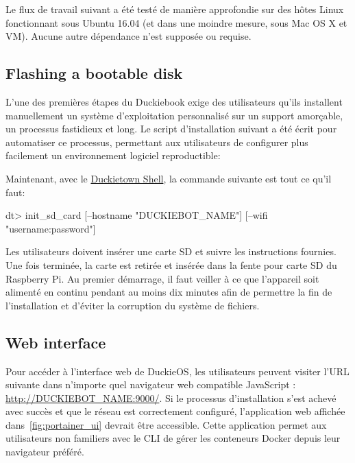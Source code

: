 \noindentent Le flux de travail suivant a été testé de manière approfondie sur des hôtes Linux fonctionnant sous Ubuntu 16.04 (et dans une moindre mesure, sous Mac OS X et VM). Aucune autre dépendance n'est supposée ou requise.

\subsection{Flashing a bootable disk}

L'une des premières étapes du Duckiebook exige des utilisateurs qu'ils installent manuellement un système d'exploitation personnalisé sur un support amorçable, un processus fastidieux et long. Le script d'installation suivant a été écrit pour automatiser ce processus, permettant aux utilisateurs de configurer plus facilement un environnement logiciel reproductible:

%
Maintenant, avec le \href{https://github.com/duckietown/duckietown-shell}{Duckietown Shell}, la commande suivante est tout ce qu'il faut:
%
\begin{dtslisting}
dt> init_sd_card [--hostname "DUCKIEBOT_NAME"] [--wifi "username:password"]
\end{dtslisting}
%
Les utilisateurs doivent insérer une carte SD et suivre les instructions fournies. Une fois terminée, la carte est retirée et insérée dans la fente pour carte SD du Raspberry Pi. Au premier démarrage, il faut veiller à ce que l'appareil soit alimenté en continu pendant au moins dix minutes afin de permettre la fin de l'installation et d'éviter la corruption du système de fichiers.

\subsection{Web interface}

Pour accéder à l'interface web de DuckieOS, les utilisateurs peuvent visiter l'URL suivante dans n'importe quel navigateur web compatible JavaScript : \url{http://DUCKIEBOT_NAME:9000/}. Si le processus d'installation s'est achevé avec succès et que le réseau est correctement configuré, l'application web affichée dans~\autoref{fig:portainer_ui} devrait être accessible. Cette application permet aux utilisateurs non familiers avec le CLI de gérer les conteneurs Docker depuis leur navigateur préféré.

